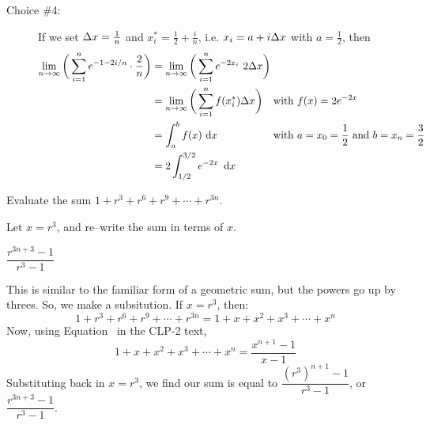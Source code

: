 \begin{solution}
\begin{description}
\item[Choice \#4:]
If we set $\Delta x = \frac{1}{n}$ and $x_i^*= \frac{1}{2}+\frac{i}{n}$, i.e. $x_i = a + i\Delta x$
with $a=\frac{1}{2}$,
then
\begin{align*}
\lim_{n\rightarrow\infty} \bigg( \sum_{i=1}^n e^{-1-2i/n}\cdot \frac{2}{n} \bigg)
&=\lim_{n\rightarrow\infty} \bigg( \sum_{i=1}^n e^{-2x_i}\ 2\De x \bigg) \hidewidth \\
&=\lim_{n\rightarrow\infty} \bigg( \sum_{i=1}^n f(x_i^*)\De x \bigg)
                       &&\text{with $f(x) = 2e^{-2x}$} \\
&=\int_a^b f(x)\,\,\dee{x}&&\text{with $a=x_0=\frac{1}{2}$ and $b=x_n=\frac{3}{2}$} \\
&=2\int_{1/2}^{3/2} e^{-2x}\ \,\dee{x}
\end{align*}

\end{description}

\end{solution}



\begin{Mquestion}\label{1.1geoma}
Evaluate the sum $1+r^3+r^6+r^9+\cdots+r^{3n}$.
\end{Mquestion}
\begin{hint}
Let $x=r^3$, and re--write the sum in terms of $x$.
\end{hint}
\begin{answer}
$\dfrac{r^{3n+3}-1}{r^3-1}$
\end{answer}
\begin{solution}
This is similar to the familiar form of a geometric sum, but the powers go up by threes. So, we make a subsitution. If $x=r^3$, then:
\[
1+r^3+r^6+r^9+\cdots+r^{3n}=1+x+x^2+x^3+\cdots+x^n\]
Now, using Equation~ in the CLP-2 text,
\[
1+x+x^2+x^3+\cdots+x^n = \frac{x^{n+1}-1}{x-1}\]
Substituting back in $x=r^3$, we find our sum is equal to $\dfrac{(r^3)^{n+1}-1}{r^3-1}$, or
$\dfrac{r^{3n+3}-1}{r^3-1}$.
\end{solution}

